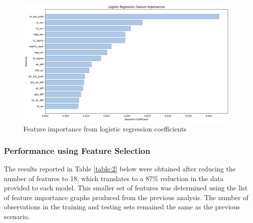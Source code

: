 \begin{figure}[h]
	
	\centering
	\begin{adjustbox}{center} %
		\includegraphics[width=1.3\textwidth]{Figures/logreg-imp.png}
	\end{adjustbox}
	\caption{Feature importance from logistic regression coefficients}
	\label{fig:logimp}
\end{figure}

\subsubsection{Performance using Feature Selection}

The results reported in Table \ref{table:2} below were obtained after reducing the number of features to 18, which translates to a 87\% reduction in the data provided to each model. This smaller set of features was determined using the list of feature importance graphs produced from the previous analysis. The number of observations in the training and testing sets remained the same as the previous scenario.

